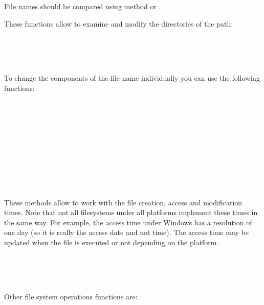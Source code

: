 File names should be compared using  method
or .


\label{filenamecomponents}

These functions allow to examine and modify the directories of the path:

\\
\\
\\

To change the components of the file name individually you can use the
following functions:

\\
\\
\\
\\
\\
\\
\\
\\
\\


\label{filenameoperations}

These methods allow to work with the file creation, access and modification
times. Note that not all filesystems under all platforms implement these times
in the same way. For example, the access time under Windows has a resolution of
one day (so it is really the access date and not time). The access time may be
updated when the file is executed or not depending on the platform.

\\
\\
\\

Other file system operations functions are:

\\

